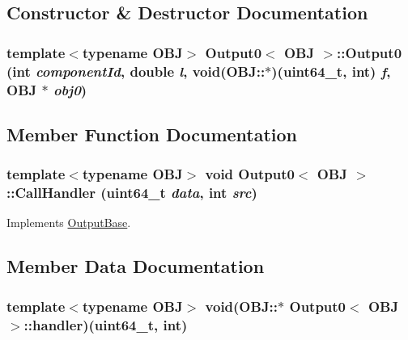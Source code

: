 \subsection{Constructor \& Destructor Documentation}
\hypertarget{classOutput0_87632bde7780d0da8dc4fb19bf862d95}{
\subsubsection[{Output0}]{\setlength{\rightskip}{0pt plus 5cm}template$<$typename OBJ$>$ {\bf Output0}$<$ OBJ $>$::{\bf Output0} (int {\em componentId}, \/  double {\em l}, \/  void(OBJ::$\ast$)(uint64\_\-t, int) {\em f}, \/  OBJ $\ast$ {\em obj0})}}
\label{classOutput0_87632bde7780d0da8dc4fb19bf862d95}




\subsection{Member Function Documentation}
\hypertarget{classOutput0_37e386a07fe2a033a847a39973458941}{
\subsubsection[{CallHandler}]{\setlength{\rightskip}{0pt plus 5cm}template$<$typename OBJ$>$ void {\bf Output0}$<$ OBJ $>$::CallHandler (uint64\_\-t {\em data}, \/  int {\em src})}}
\label{classOutput0_37e386a07fe2a033a847a39973458941}




Implements \hyperlink{classOutputBase_2d7b62cb9883958534b55b7bfa391394}{OutputBase}.

\subsection{Member Data Documentation}
\hypertarget{classOutput0_3c30dd558372ba2fcbaa0748947b5161}{
\subsubsection[{handler}]{\setlength{\rightskip}{0pt plus 5cm}template$<$typename OBJ$>$ void(OBJ::$\ast$ {\bf Output0}$<$ OBJ $>$::{\bf handler})(uint64\_\-t, int)}}
\label{classOutput0_3c30dd558372ba2fcbaa0748947b5161}


